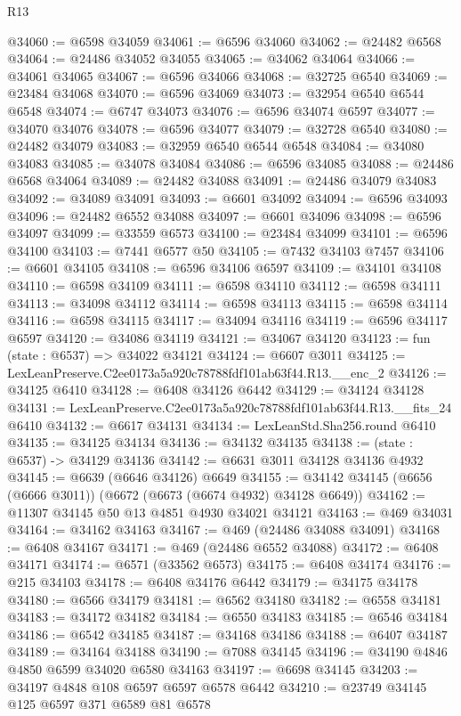 \begin{lexlean}{R13}
\begin{coremodule}
@34060 := @6598 @34059
@34061 := @6596 @34060
@34062 := @24482 @6568
@34064 := @24486 @34052 @34055
@34065 := @34062 @34064
@34066 := @34061 @34065
@34067 := @6596 @34066
@34068 := @32725 @6540
@34069 := @23484 @34068
@34070 := @6596 @34069
@34073 := @32954 @6540 @6544 @6548
@34074 := @6747 @34073
@34076 := @6596 @34074 @6597
@34077 := @34070 @34076
@34078 := @6596 @34077
@34079 := @32728 @6540
@34080 := @24482 @34079
@34083 := @32959 @6540 @6544 @6548
@34084 := @34080 @34083
@34085 := @34078 @34084
@34086 := @6596 @34085
@34088 := @24486 @6568 @34064
@34089 := @24482 @34088
@34091 := @24486 @34079 @34083
@34092 := @34089 @34091
@34093 := @6601 @34092
@34094 := @6596 @34093
@34096 := @24482 @6552 @34088
@34097 := @6601 @34096
@34098 := @6596 @34097
@34099 := @33559 @6573
@34100 := @23484 @34099
@34101 := @6596 @34100
@34103 := @7441 @6577 @50
@34105 := @7432 @34103 @7457
@34106 := @6601 @34105
@34108 := @6596 @34106 @6597
@34109 := @34101 @34108
@34110 := @6598 @34109
@34111 := @6598 @34110
@34112 := @6598 @34111
@34113 := @34098 @34112
@34114 := @6598 @34113
@34115 := @6598 @34114
@34116 := @6598 @34115
@34117 := @34094 @34116
@34119 := @6596 @34117 @6597
@34120 := @34086 @34119
@34121 := @34067 @34120
@34123 := fun (state : @6537) => @34022 @34121
@34124 := @6607 @3011
@34125 := LexLeanPreserve.C2ee0173a5a920c78788fdf101ab63f44.R13.__enc_2
@34126 := @34125 @6410
@34128 := @6408 @34126 @6442
@34129 := @34124 @34128
@34131 := LexLeanPreserve.C2ee0173a5a920c78788fdf101ab63f44.R13.__fits_24 @6410
@34132 := @6617 @34131
@34134 := LexLeanStd.Sha256.round @6410
@34135 := @34125 @34134
@34136 := @34132 @34135
@34138 := (state : @6537) -> @34129 @34136
@34142 := @6631 @3011 @34128 @34136 @4932
@34145 := @6639 (@6646 @34126) @6649
@34155 := @34142 @34145 (@6656 (@6666 @3011)) (@6672 (@6673 (@6674 @4932) @34128 @6649))
@34162 := @11307 @34145 @50 @13 @4851 @4930 @34021 @34121
@34163 := @469 @34031
@34164 := @34162 @34163
@34167 := @469 (@24486 @34088 @34091)
@34168 := @6408 @34167
@34171 := @469 (@24486 @6552 @34088)
@34172 := @6408 @34171
@34174 := @6571 (@33562 @6573)
@34175 := @6408 @34174
@34176 := @215 @34103
@34178 := @6408 @34176 @6442
@34179 := @34175 @34178
@34180 := @6566 @34179
@34181 := @6562 @34180
@34182 := @6558 @34181
@34183 := @34172 @34182
@34184 := @6550 @34183
@34185 := @6546 @34184
@34186 := @6542 @34185
@34187 := @34168 @34186
@34188 := @6407 @34187
@34189 := @34164 @34188
@34190 := @7088 @34145
@34196 := @34190 @4846 @4850 @6599 @34020 @6580 @34163
@34197 := @6698 @34145
@34203 := @34197 @4848 @108 @6597 @6597 @6578 @6442
@34210 := @23749 @34145 @125 @6597 @371 @6589 @81 @6578

\end{coremodule}
\end{lexlean}
